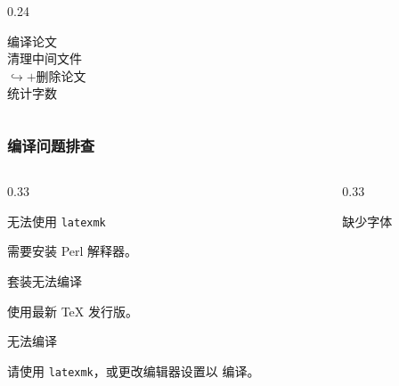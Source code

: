 \begin{frame}
\begin{columns}
\begin{column}{0.24\textwidth}
\begin{block}{\faInfo}
        \ttfamily

        编译论文\\

        清理中间文件\\

        $\hookrightarrow +$删除论文\\

        统计字数

      \end{block}

    \end{column}

  \end{columns}

\end{frame}

\begin{frame}[label=compile]

  \frametitle{编译问题排查}

  \begin{columns}

    \begin{column}{0.33\textwidth}

      \begin{alertblock}{无法使用 \texttt{latexmk}}

         需要安装 Perl 解释器。

      \end{alertblock}

      \begin{alertblock}{\CTeX{} 套装无法编译}

        使用最新 \TeX{} 发行版。

      \end{alertblock}

      \begin{alertblock}{ 无法编译}

        请使用 \texttt{latexmk}，或更改编辑器设置以  编译。

      \end{alertblock}

    \end{column}

    \begin{column}{0.33\textwidth}

      \begin{alertblock}{缺少字体 }


\end{alertblock}
\end{column}
\end{columns}
\end{frame}
